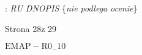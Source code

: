\documentclass[a4paper,12pt]{article}
\begin{document}
: {\it RU DNOPIS} \{{\it nie podlega ocenie}\}

Strona 28z 29

$\mathrm{E}\mathrm{M}\mathrm{A}\mathrm{P}-\mathrm{R}0_{-}10$
\end{document}
